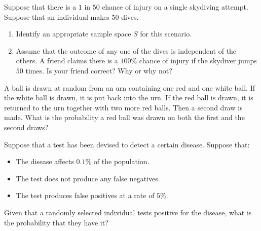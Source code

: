 \documentclass[12pt,reqno]{amsart}
\begin{document}
\bigskip
\prob Suppose that there is a $1$ in $50$ chance of injury on a single skydiving attempt. Suppose that an individual makes 50 dives.

\medskip
\begin{enumerate}
    \item Identify an appropriate sample space $S$ for this scenario.\vfill
    
    

    \item Assume that the outcome of any one of the dives is independent of the others. A friend claims there is a $100\%$ chance of injury if the skydiver jumps $50$ times. Is your friend correct? Why or why not?\vfill
    
    
\end{enumerate}

















\newpage
\prob A ball is drawn at random from an urn containing one red and one white ball. If the white ball is drawn, it is put back into the urn. If the red ball is drawn, it is returned to the urn together with two more red balls. Then a second draw is made. What is the probability a red ball was drawn on both the first and the second draws?\vfill

























\bigskip
\prob Suppose that a test has been devised to detect a certain disease. Suppose that:

\begin{itemize}
    \item The disease affects $0.1\%$ of the population.
    \item The test does not produce any false negatives.
    \item The test produces false positives at a rate of $5\%$.
\end{itemize}

Given that a randomly selected individual tests positive for the disease, what is the probability that they have it?
\vfill
\end{document}
